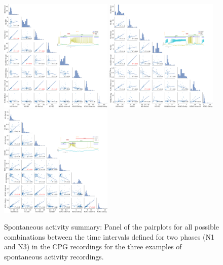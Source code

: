 \begin{figure}[htbp]
	\centering
	\includegraphics[width=0.48\textwidth]{./img/invariants/data/SUSSEX/prep2/images/2phases/panel_with_pairplot.png}
	\includegraphics[width=0.48\textwidth]{./img/invariants/data/SUSSEX/prep3/images/2phases/panel_with_pairplot.png}
	\includegraphics[width=0.48\textwidth]{./img/invariants/data/SUSSEX/prep1/images/2phases/panel_with_pairplot.png}
	\caption{Spontaneous activity summary: Panel of the pairplots for all possible combinations between the time intervals defined for two phases (N1 and N3) in the CPG recordings for the three examples of spontaneous activity recordings.}
	\label{fig:spontaneous pairplot comparison}
\end{figure}



